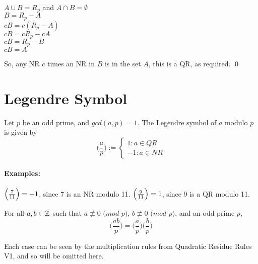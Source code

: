 \documentclass[../main.tex]{subfiles}
\begin{document}
\begin{pf}
    \begin{center}
        $A\cup B=R_p$ and $A\cap B=\emptyset$\\
        $B=R_p-A$ \\
        $cB=c(R_p-A)$ \\
        $cB=cR_p-cA$ \\
        $cB=R_p-B$ \\
        $cB=A$
    \end{center}
    So, any NR $c$ times an NR in $B$ is in the set $A$, this is a QR, as required. \qed 
\end{pf}
\section{Legendre Symbol}
\begin{defn}
    Let $p$ be an odd prime, and $gcd(a,p)=1$. The Legendre symbol of $a$ modulo $p$ is given by
    $$\bigg(\frac{a}{p}\bigg):= 
    \begin{cases} 
      1:a\in QR \\
      -1:a \in NR
   \end{cases}$$
\end{defn}

\paragraph{Examples:} $\Big(\frac{7}{11}\Big)=-1$, since 7 is an NR modulo 11. $\Big(\frac{9}{11}\Big)=1$, since 9 is a QR modulo 11.

\begin{thm}
    For all $a,b \in \mathbb{Z}$ such that $a \not\equiv 0$ $(mod$ $p)$, $b \not\equiv 0$ $(mod$ $p)$, and an odd prime $p$,
    $$\bigg(\frac{ab}{p}\bigg) = \bigg(\frac{a}{p}\bigg) \bigg(\frac{b}{p}\bigg)$$
\end{thm}
\begin{pf}
    Each case can be seen by the multiplication rules from Quadratic Residue Rules V1, and so will be omitted here.
\end{pf}
\end{document}
